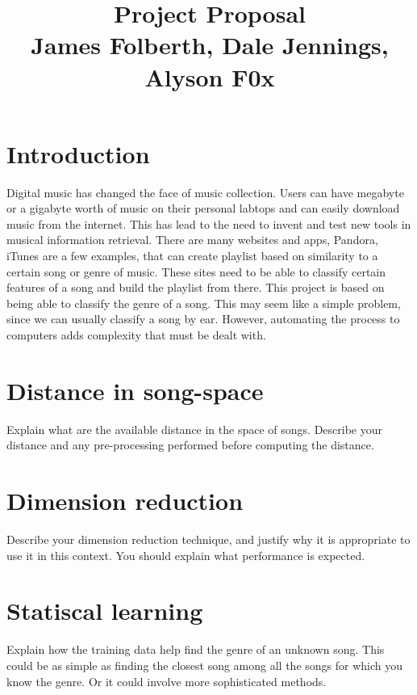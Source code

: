 \documentclass[12pt]{article}
\begin{document}
                                       
\title{Project Proposal\\
James Folberth, Dale Jennings, Alyson F0x}
\maketitle
\section{Introduction}
Digital music has changed the face of music collection. Users can have megabyte or a gigabyte worth of music on their personal labtops and can easily download music from the internet. This has lead to the need to invent and test new tools in musical information retrieval. There are many websites and apps, Pandora, iTunes are a few examples, that can create playlist based on similarity to a certain song or genre of music. These sites need to be able to classify certain features of a song and build the playlist from there. This project is based on being able to classify the genre of a song. This may seem like a simple problem, since we can usually classify a song by ear. However, automating the process to computers adds complexity that must be dealt with. 
\section{Distance in song-space}
Explain what are the available distance in the space of songs.
Describe your distance and any pre-processing performed before
computing the distance.
\section{Dimension reduction}
Describe your dimension reduction technique, and justify why it 
is appropriate to use it in this context. You should explain what 
performance is expected.
\section{Statiscal learning}
Explain how the training data help find the genre of an unknown
song. This could be as simple as finding the closest song among all
the songs for which you know the genre. Or it could involve more
sophisticated methods.
\end{document}
